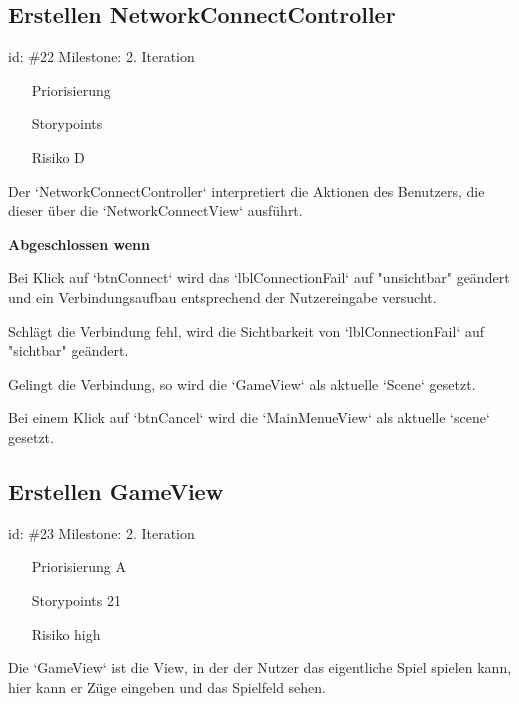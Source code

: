 \subsection*{Erstellen NetworkConnectController}
id: \#22 Milestone: 2. Iteration\\

\begin{itemize}
\item[Priorisierung] 
\item[Storypoints] 
\item[Risiko] D
\end{itemize}

Der `NetworkConnectController` interpretiert die Aktionen des Benutzers, die dieser über die `NetworkConnectView` ausführt.

\textbf{Abgeschlossen wenn}
\begin{todolist}
    \item  Bei Klick auf `btnConnect` wird das `lblConnectionFail` auf "unsichtbar" geändert und ein Verbindungsaufbau entsprechend der Nutzereingabe versucht.
  \item  Schlägt die Verbindung fehl, wird die Sichtbarkeit von `lblConnectionFail` auf "sichtbar" geändert.
  \item  Gelingt die Verbindung, so wird die `GameView` als aktuelle `Scene` gesetzt.
  \item[\done]  Bei einem Klick auf `btnCancel` wird die `MainMenueView` als aktuelle `scene` gesetzt.

\end{todolist}


\subsection*{Erstellen GameView}
id: \#23 Milestone: 2. Iteration\\

\begin{itemize}
\item[Priorisierung] A
\item[Storypoints] 21
\item[Risiko] high
\end{itemize}

Die `GameView` ist die View, in der der Nutzer das eigentliche Spiel spielen kann, hier kann er Züge eingeben und das Spielfeld sehen.

